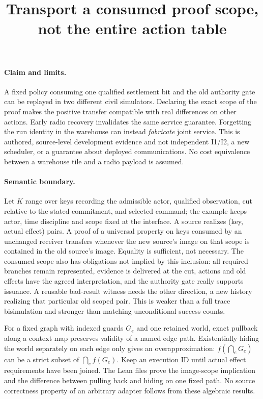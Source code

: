 \documentclass[11pt]{article}
\title{Transport a consumed proof scope, not the entire action table}
\date{}
\begin{document}
\maketitle

\paragraph{Claim and limits.}
A fixed policy consuming one qualified settlement bit and the old
authority gate can be replayed in two different civil simulators. Declaring
the exact scope of the proof makes the positive transfer compatible with
real differences on other actions. Early radio recovery invalidates the
same service guarantee. Forgetting the run identity in the warehouse
can instead \emph{fabricate} joint service. This is authored, source-level
development evidence and not independent I1/I2, a new scheduler, or a
guarantee about deployed communications. No cost equivalence between a
warehouse tile and a radio payload is assumed.

\paragraph{Semantic boundary.}
Let $K$ range over keys recording the admissible actor, qualified
observation, cut relative to the stated commitment, and selected command;
the example keeps actor, time discipline and scope fixed at the
interface. A source realizes (key, actual effect) pairs. A proof of a
universal property on keys consumed by an unchanged receiver transfers
whenever the new source's image on that scope is contained in the old
source's image. Equality is sufficient, not necessary. The consumed scope
also has obligations not implied by this inclusion: all required branches
remain represented, evidence is delivered at the cut, actions and old
effects have the agreed interpretation, and the authority gate really
supports issuance. A reusable bad-result witness needs the other
direction, a new history realizing that particular old scoped pair. This
is weaker than a full trace bisimulation and stronger than matching
unconditional success counts.

For a fixed graph with indexed guards $G_e$ and one retained world, exact
pullback along a context map preserves validity of a named edge path.
Existentially hiding the world separately on each edge only gives an
overapproximation: $f(\bigcap_e G_e)$ can be a strict subset of
$\bigcap_e f(G_e)$. Keep an execution ID until actual effect requirements
have been joined. The Lean files prove the image-scope implication and
the difference between pulling back and hiding on one fixed path. No
source correctness property of an arbitrary adapter follows from these
algebraic results.
\end{document}
